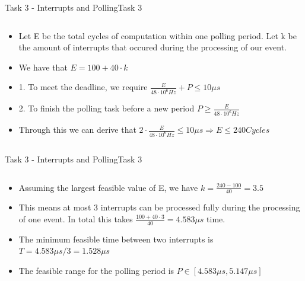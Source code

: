 \begin{frame}[fragile]{Task 3 - Interrupts and Polling}{Task 3}
  \begin{solution}
    \begin{columns}
      \begin{column}{0.8\textwidth}
        \begin{itemize}
          \item Let E be the total cycles of computation within one polling period. Let k be the amount of interrupts that occured during the processing of our event.
          \item We have that $E = 100 + 40 \cdot k$
          \item 1. To meet the deadline, we require $\frac{E}{48 \cdot 10^6Hz} + P \leq 10\mu s$
          \item 2. To finish the polling task before a new period $P \geq \frac{E}{48 \cdot 10^6Hz}$
          \item Through this we can derive that $2 \cdot \frac{E}{48 \cdot 10^6Hz} \leq 10\mu s \Rightarrow E \leq 240 Cycles$
        \end{itemize}
      \end{column}
    \end{columns}
  \end{solution}
\end{frame}

\begin{frame}[fragile]{Task 3 - Interrupts and Polling}{Task 3}
  \begin{solutionnoinc}
    \begin{columns}
      \begin{column}{0.8\textwidth}
        \begin{itemize}
          \item Assuming the largest feasible value of E, we have $k = \frac{240 - 100}{40} = 3.5$
          \item This means at most 3 interrupts can be processed fully during the processing of one event. In total this takes $\frac{100 + 40 \cdot 3}{40} = 4.583\mu s$ time.
          \item The minimum feasible time between two interrupts is $T = 4.583\mu s/3 = 1.528\mu s$
          \item The feasible range for the polling period is $P \in [4.583\mu s, 5.147\mu s]$
        \end{itemize}
      \end{column}
    \end{columns}
  \end{solutionnoinc}
\end{frame}
